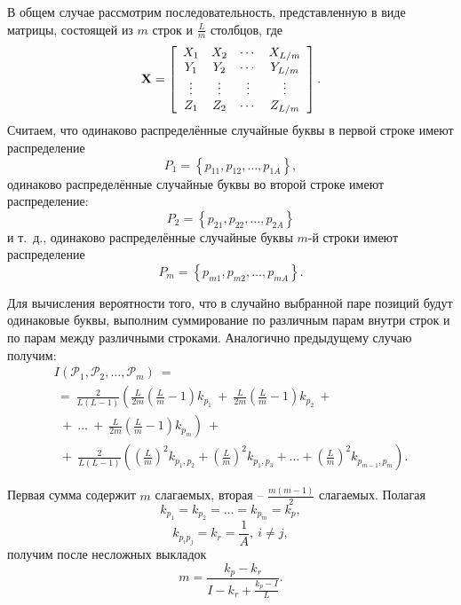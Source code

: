 В общем случае рассмотрим последовательность, представленную в виде матрицы, состоящей из $m$ строк и $\frac{L}{m}$ столбцов, где
\[
{\mathbf X} = \left[ {\begin{array}{*{20}c}
   {X_1 } & {X_2 } &  \cdots  & {X_{L/m} }  \\
   {Y_1 } & {Y_2 } &  \cdots  & {Y_{L/m} }  \\
    \vdots  &  \vdots  &  \vdots  &  \vdots   \\
   {Z_1 } & {Z_2 } &  \cdots  & {Z_{L/m} }  \\
\end{array}} \right].
\]
Считаем, что одинаково распределённые случайные буквы в первой строке имеют распределение
    \[ P_1  = \left\{ {p_{11} ,p_{12} , \ldots , p_{1A} } \right\}, \]
одинаково распределённые случайные буквы во второй строке имеют распределение:
    \[ P_2  = \left\{ {p_{21} ,p_{22} , \ldots , p_{2A} } \right\} \]
и т.~д., одинаково распределённые случайные буквы $m$-й строки имеют распределение
    \[ P_m  = \left\{ {p_{m1},p_{m2} , \ldots , p_{mA} } \right\}. \]

Для вычисления вероятности того, что в случайно выбранной паре позиций будут одинаковые буквы, выполним суммирование по различным парам внутри строк и по парам между различными строками. Аналогично предыдущему случаю получим:
\[\begin{array}{l}
	I(\mathcal{P}_1, \mathcal{P}_2, \ldots, \mathcal{P}_m ) ~= \\
	~=~ \frac{2}{L(L - 1)} \left( \frac{L}{2m} \left( \frac{L}{m} - 1 \right) k_{p_1} ~+~ \frac{L}{2m} \left( \frac{L}{m} - 1 \right) k_{p_2} ~+ \right. \\
	~~+~ \dots ~+~ \left. \frac{L}{2m} \left( \frac{L}{m} - 1 \right) k_{p_m} \right) ~+ \\
	~~+~ \frac{2}{L(L - 1)} \left( \left( \frac{L}{m} \right)^2 k_{p_1, p_2} + \left( \frac{L}{m} \right)^2 k_{p_1, p_3} + \dots + \left( \frac{L}{m} \right)^2 k_{p_{m - 1}, p_m } \right).
\end{array}\]

Первая сумма содержит $m$ слагаемых, вторая -- $ \frac{m(m-1)}{2}$ слагаемых. Полагая
    \[ k_{p_1} = k_{p_2} = \dots = k_{p_m} = k_p, \]
    \[ k_{p_i p_j } = k_r = \frac{1}{A}, ~ i \ne j, \]
получим после несложных выкладок
    \[ m = \frac{k_p  - k_r}{I - k_r  + \frac{k_p  - I}{L}}. \]
